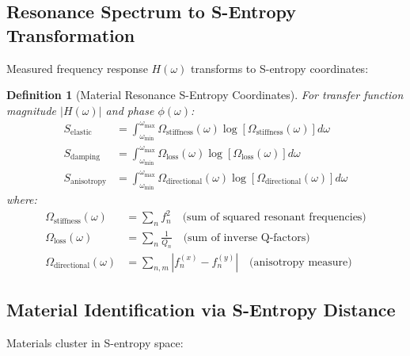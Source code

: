 \documentclass[12pt,a4paper]{article}
\newtheorem{definition}{Definition}
\begin{document}
\subsection{Resonance Spectrum to S-Entropy Transformation}

Measured frequency response $H(\omega)$ transforms to S-entropy coordinates:

\begin{definition}[Material Resonance S-Entropy Coordinates]
For transfer function magnitude $|H(\omega)|$ and phase $\phi(\omega)$:
\begin{align}
S_{\text{elastic}} &= \int_{\omega_{\min}}^{\omega_{\max}} \Omega_{\text{stiffness}}(\omega) \log[\Omega_{\text{stiffness}}(\omega)] d\omega \\
S_{\text{damping}} &= \int_{\omega_{\min}}^{\omega_{\max}} \Omega_{\text{loss}}(\omega) \log[\Omega_{\text{loss}}(\omega)] d\omega \\
S_{\text{anisotropy}} &= \int_{\omega_{\min}}^{\omega_{\max}} \Omega_{\text{directional}}(\omega) \log[\Omega_{\text{directional}}(\omega)] d\omega
\end{align}
where:
\begin{align}
\Omega_{\text{stiffness}}(\omega) &= \sum_{n} f_n^2 \quad \text{(sum of squared resonant frequencies)} \\
\Omega_{\text{loss}}(\omega) &= \sum_{n} \frac{1}{Q_n} \quad \text{(sum of inverse Q-factors)} \\
\Omega_{\text{directional}}(\omega) &= \sum_{n,m} |f_n^{(x)} - f_n^{(y)}| \quad \text{(anisotropy measure)}
\end{align}
\end{definition}

\subsection{Material Identification via S-Entropy Distance}

Materials cluster in S-entropy space:

\begin{center}
\end{center}
\end{document}
